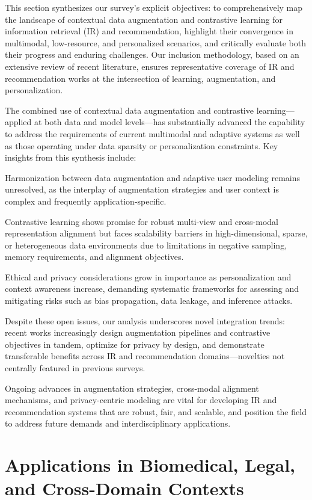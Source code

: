 \documentclass[sigconf]{acmart}
\begin{document}
This section synthesizes our survey's explicit objectives: to comprehensively map the landscape of contextual data augmentation and contrastive learning for information retrieval (IR) and recommendation, highlight their convergence in multimodal, low-resource, and personalized scenarios, and critically evaluate both their progress and enduring challenges. Our inclusion methodology, based on an extensive review of recent literature, ensures representative coverage of IR and recommendation works at the intersection of learning, augmentation, and personalization.

The combined use of contextual data augmentation and contrastive learning—applied at both data and model levels—has substantially advanced the capability to address the requirements of current multimodal and adaptive systems as well as those operating under data sparsity or personalization constraints. Key insights from this synthesis include:

Harmonization between data augmentation and adaptive user modeling remains unresolved, as the interplay of augmentation strategies and user context is complex and frequently application-specific.

Contrastive learning shows promise for robust multi-view and cross-modal representation alignment but faces scalability barriers in high-dimensional, sparse, or heterogeneous data environments due to limitations in negative sampling, memory requirements, and alignment objectives.

Ethical and privacy considerations grow in importance as personalization and context awareness increase, demanding systematic frameworks for assessing and mitigating risks such as bias propagation, data leakage, and inference attacks.

Despite these open issues, our analysis underscores novel integration trends: recent works increasingly design augmentation pipelines and contrastive objectives in tandem, optimize for privacy by design, and demonstrate transferable benefits across IR and recommendation domains—novelties not centrally featured in previous surveys. 

Ongoing advances in augmentation strategies, cross-modal alignment mechanisms, and privacy-centric modeling are vital for developing IR and recommendation systems that are robust, fair, and scalable, and position the field to address future demands and interdisciplinary applications.

\section{Applications in Biomedical, Legal, and Cross-Domain Contexts}
\end{document}
